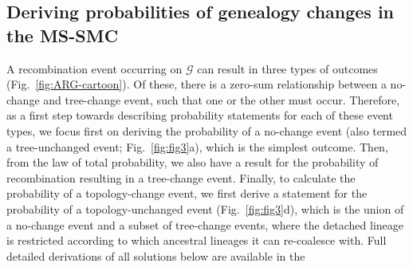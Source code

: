 \documentclass[11pt]{article}
\begin{document}


\subsection{Deriving probabilities of genealogy changes in the MS-SMC}
A recombination event occurring on $\mathcal{G}$ can result 
in three types of outcomes (Fig.~\ref{fig:ARG-cartoon}).
Of these, there is a zero-sum relationship between a no-change and 
tree-change event, such that one or the other must occur.
Therefore, as a first step towards describing probability statements 
for each of these event types, we focus first on deriving the 
probability of a no-change event 
(also termed a tree-unchanged event; Fig.~\ref{fig:fig3}a),
which is the simplest outcome. Then, from the law of total probability, 
we also have a result for the probability of recombination resulting in 
a tree-change event. 
Finally, to calculate the probability of a topology-change event, 
we first derive a statement for the probability of a topology-unchanged event
(Fig.~\ref{fig:fig3}d), which is the union of a no-change event and
a subset of tree-change events,
where the detached lineage is restricted according to which ancestral lineages 
it can re-coalesce with. 
Full detailed derivations of all solutions below are available in the 
\end{document}
